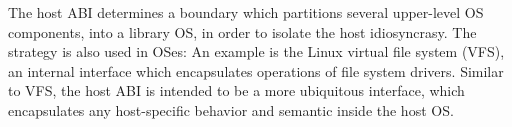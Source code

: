 The host ABI 
determines a boundary which partitions several upper-level OS components, %
into a library OS,
in order to isolate the host idiosyncrasy. %
The strategy
is also used in OSes:
An example is the Linux virtual file system (VFS), an internal interface
which encapsulates operations of file system drivers.
Similar to VFS,
the host ABI is intended
to be a more ubiquitous interface,
which encapsulates
any host-specific behavior and semantic
inside the host OS.




